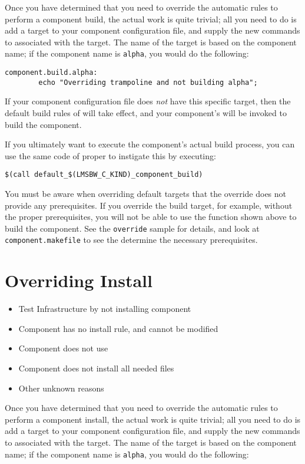 Once you have determined that you need to override the automatic rules
to perform a component build, the actual work is quite trivial; all
you need to do is add a \makefile target to your component
configuration file, and supply the new commands to associated with the
target.  The name of the target is based on the component name; if the
component name is \texttt{alpha}, you would do the following:

\begin{verbatim}
component.build.alpha:
        echo "Overriding trampoline and not building alpha";
\end{verbatim}

If your component configuration file does \emph{not} have this
specific target, then the default build rules of \lmsbw will take
effect, and your component's \makefile will be invoked to build the
component.

If you ultimately want to execute the component's actual build
process, you can use the same code of \lmsbw proper to instigate this
by executing:

\begin{verbatim}
$(call default_$(LMSBW_C_KIND)_component_build)
\end{verbatim}

You must be aware when overriding default targets that the override
does not provide any prerequisites.  If you override the build target,
for example, without the proper prerequisites, you will not be able to
use the function shown above to build the component.  See the
\texttt{override} sample for details, and look at
\texttt{component.makefile} to see the determine the necessary
prerequisites.

\section{Overriding Install}

\begin{itemize}
\item Test \bni Infrastructure by not installing component
\item Component \makefile has no install rule, and cannot be modified
\item Component \makefile does not use \destdir
\item Component does not install all needed files
\item Other unknown reasons
\end{itemize}


Once you have determined that you need to override the automatic rules
to perform a component install, the actual work is quite trivial; all
you need to do is add a \makefile target to your component
configuration file, and supply the new commands to associated with the
target.  The name of the target is based on the component name; if the
component name is \texttt{alpha}, you would do the following:


